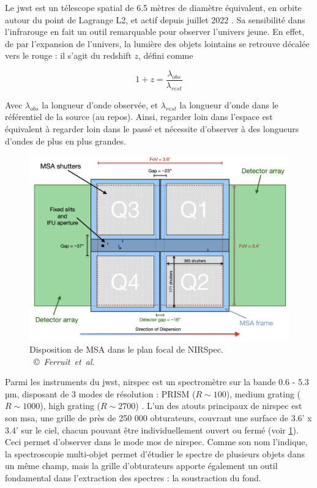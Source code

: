 \documentclass[11pt, a4paper]{article}
\newcommand{\customcite}[2]{\mbox{
  {\small \copyright} \textit{#1} \cite{#2}}
}
\begin{document}
Le \gls{jwst} est un télescope spatial de 6.5 mètres de diamètre équivalent, en orbite autour du point de Lagrange L2, et actif depuis juillet 2022 \cite{jwst_website}. Sa sensibilité dans l'infrarouge en fait un outil remarquable pour observer l'univers jeune. En effet, de par l'expansion de l'univers, la lumière des objets lointains se retrouve décalée vers le rouge : il s'agit du redshift $z$, défini comme 

\begin{equation}
    1 + z = \frac{\lambda_{obs}}{\lambda_{rest}}
\end{equation}

Avec $\lambda_{obs}$ la longueur d'onde observée, et $\lambda_{rest}$ la longueur d'onde dans le référentiel de la source (au repos). Ainsi, regarder loin dans l'espace est équivalent à regarder loin dans le passé et nécessite d'observer à des longueurs d'ondes de plus en plus grandes.

\begin{figure}[!h]
  \centering
  \includegraphics[scale=0.3]{assets/msa_ds_new.png}
  \caption{Disposition de MSA dans le plan focal de NIRSpec. \customcite{Ferruit et al.}{2022A&A...661A..81F}}
  \label{fig:msa_shutter}
\end{figure}

Parmi les instruments du \gls{jwst}, \gls{nirspec} est un spectromètre sur la bande 0.6 - 5.3  µm, disposant de 3 modes de résolution : PRISM ($R \sim 100$), medium grating ($R \sim 1000$), high grating ($R \sim 2700$) \cite{nirspec}. L'un des atouts principaux de \gls{nirspec} est son \gls{msa}, une grille de près de 250 000 obturateurs, couvrant une surface de 3.6' x 3.4' sur le ciel, chacun pouvant être individuellement ouvert ou fermé \cite{msa} (voir \ref{fig:msa_shutter}). Ceci permet d'observer dans le mode \gls{mos} de \gls{nirspec}. Comme son nom l'indique, la spectroscopie multi-objet permet d'étudier le spectre de plusieurs objets dans un même champ, mais la grille d'obturateurs apporte également un outil fondamental dans l'extraction des spectres : la soustraction du fond.\\
\end{document}
